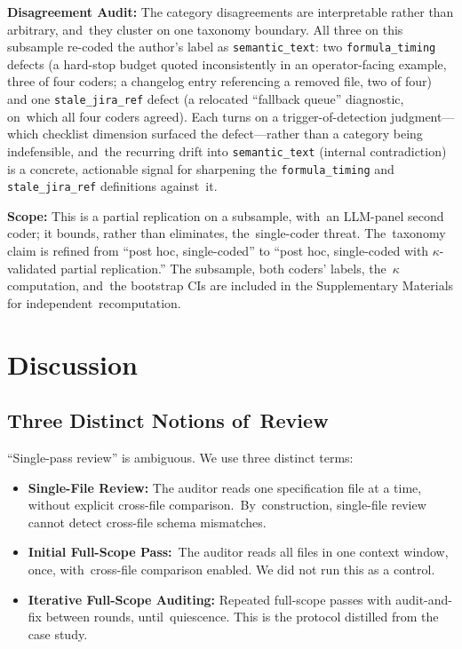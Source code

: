 \documentclass[software,article,accept,pdftex,oneauthor]{Definitions/mdpi}
\def\hl#1{#1}
\begin{document}
\textbf{Disagreement Audit:} The category disagreements are interpretable rather than arbitrary, and~they cluster on one taxonomy boundary. All three on this subsample re-coded the author's label as \texttt{semantic\_text}: two \texttt{formula\_timing} defects (a hard-stop budget quoted inconsistently in an operator-facing example, three of four coders; a changelog entry referencing a removed file, two of four) and one \texttt{stale\_jira\_ref} defect (a relocated ``fallback queue'' diagnostic, on~which all four coders agreed). Each turns on a trigger-of-detection judgment---which checklist dimension surfaced the defect---rather than a category being indefensible, and~the recurring drift into \texttt{semantic\_text} (internal contradiction) is a concrete, actionable signal for sharpening the \texttt{formula\_timing} and \texttt{stale\_jira\_ref} definitions against~it.

\textbf{Scope:} This is a partial replication on a subsample, with~an LLM-panel second coder; it bounds, rather than eliminates, the~single-coder threat. The~taxonomy claim is refined \hl{from ``post hoc, single-coded'' to ``post hoc, single-coded with $\kappa$-validated partial replication.''} %
 The subsample, both coders' labels, the~$\kappa$ computation, and~the bootstrap CIs are included in the Supplementary Materials for independent~recomputation.

\section{Discussion}
\label{sec:discussion}
\unskip

\subsection{Three Distinct Notions of~Review}

``Single-pass review'' is ambiguous. We use three distinct terms:

\begin{itemize}
\item \textbf{Single-File Review:} The auditor reads one specification file at a time, without explicit cross-file comparison.~By~construction, single-file review cannot detect cross-file schema mismatches.
\item \textbf{Initial Full-Scope Pass:}~The auditor reads all files in one context window, once, with~cross-file comparison enabled. We did not run this as a control.
\item \textbf{Iterative Full-Scope Auditing:} Repeated full-scope passes with audit-and-fix between rounds, until~quiescence. This is the protocol distilled from the case study.
\end{itemize}
\end{document}
